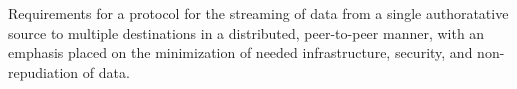 \documentclass{ubb_dolgozat}
\author{Gardner Márk}
\begin{document}
\begin{abstractEN}
Requirements for a protocol for the streaming of data from a single
authoratative source to multiple destinations in a distributed,
peer-to-peer manner, with an emphasis placed on the minimization of
needed infrastructure, security, and non-repudiation of data.
\end{abstractEN}
\maketitle
\tableofcontents




\end{document}
